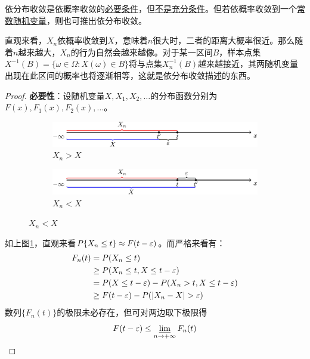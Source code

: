 \begin{proposition}\label{prop:CP_VS_CD}
    依分布收敛是依概率收敛的\underline{必要条件}，但\underline{不是充分条件}。但若依概率收敛到一个\underline{常数随机变量}，则也可推出依分布收敛。
\end{proposition}
\begin{remark}
    直观来看，$X_n$依概率收敛到$X$，意味着$n$很大时，二者的距离大概率很近。那么随着$n$越来越大，$X_n$的行为自然会越来越像。对于某一区间$B$，样本点集$X^{-1}(B)=\{\omega\in\Omega : X(\omega) \in B\}$将与点集$X^{-1}_n(B)$越来越接近，其两随机变量出现在此区间的概率也将逐渐相等，这就是依分布收敛描述的东西。
\end{remark}
\begin{proof}
    \textbf{必要性}：设随机变量$X, X_1,  X_2, \dotsc$的分布函数分别为$F(x), F_1(x), F_2(x), \dotsc$。
    \begin{figure}[H]
        \centering
        \begin{subfigure}[]{0.8\textwidth}
            \centering
            \includegraphics[width=\textwidth]{image/CP_to_CF1.jpg}
            \caption{$X_n>X$}
            \label{fig:CP_to_CF1}
        \end{subfigure}
        \begin{subfigure}[]{0.8\textwidth}
            \centering
            \includegraphics[width=\textwidth]{image/CP_to_CF2.jpg}
            \caption{$X_n<X$}
            \label{fig:CP_to_CF2}
        \end{subfigure}
        \label{fig:CP_to_CF}
    \end{figure}
    如上图\ref{fig:CP_to_CF1}，直观来看$P\{ X_n\le t \} \approx F(t-\varepsilon)$。而严格来看有：
    \begin{align*}
        F_n(t) & = P(X_n\le t)                                     \\
               & \ge P(X_n\le t,X\le t-\varepsilon)                         \\
               & =P(X\le t-\varepsilon) - P(X_n > t,X\le t-\varepsilon)              \\
               & \ge F(t-\varepsilon) - P(\left\vert X_n-X \right\vert >\varepsilon)
    \end{align*}
    数列$\{ F_n(t) \}$的极限未必存在，但可对两边取下极限得
    \[ F(t-\varepsilon) \leq \varliminf_{n \to +\infty} F_n(t) \]


\end{proof}
